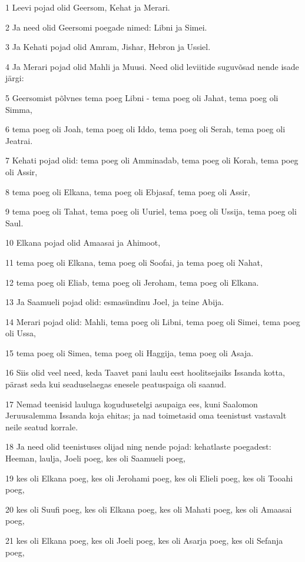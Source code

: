 \par 1 Leevi pojad olid Geersom, Kehat ja Merari.
\par 2 Ja need olid Geersomi poegade nimed: Libni ja Simei.
\par 3 Ja Kehati pojad olid Amram, Jishar, Hebron ja Ussiel.
\par 4 Ja Merari pojad olid Mahli ja Muusi. Need olid leviitide suguvõsad nende isade järgi:
\par 5 Geersomist põlvnes tema poeg Libni - tema poeg oli Jahat, tema poeg oli Simma,
\par 6 tema poeg oli Joah, tema poeg oli Iddo, tema poeg oli Serah, tema poeg oli Jeatrai.
\par 7 Kehati pojad olid: tema poeg oli Amminadab, tema poeg oli Korah, tema poeg oli Assir,
\par 8 tema poeg oli Elkana, tema poeg oli Ebjasaf, tema poeg oli Assir,
\par 9 tema poeg oli Tahat, tema poeg oli Uuriel, tema poeg oli Ussija, tema poeg oli Saul.
\par 10 Elkana pojad olid Amaasai ja Ahimoot,
\par 11 tema poeg oli Elkana, tema poeg oli Soofai, ja tema poeg oli Nahat,
\par 12 tema poeg oli Eliab, tema poeg oli Jeroham, tema poeg oli Elkana.
\par 13 Ja Saamueli pojad olid: esmasündinu Joel, ja teine Abija.
\par 14 Merari pojad olid: Mahli, tema poeg oli Libni, tema poeg oli Simei, tema poeg oli Ussa,
\par 15 tema poeg oli Simea, tema poeg oli Haggija, tema poeg oli Asaja.
\par 16 Siis olid veel need, keda Taavet pani laulu eest hoolitsejaiks Issanda kotta, pärast seda kui seaduselaegas enesele peatuspaiga oli saanud.
\par 17 Nemad teenisid lauluga kogudusetelgi asupaiga ees, kuni Saalomon Jeruusalemma Issanda koja ehitas; ja nad toimetasid oma teenistust vastavalt neile seatud korrale.
\par 18 Ja need olid teenistuses olijad ning nende pojad: kehatlaste poegadest: Heeman, laulja, Joeli poeg, kes oli Saamueli poeg,
\par 19 kes oli Elkana poeg, kes oli Jerohami poeg, kes oli Elieli poeg, kes oli Tooahi poeg,
\par 20 kes oli Suufi poeg, kes oli Elkana poeg, kes oli Mahati poeg, kes oli Amaasai poeg,
\par 21 kes oli Elkana poeg, kes oli Joeli poeg, kes oli Asarja poeg, kes oli Sefanja poeg,
